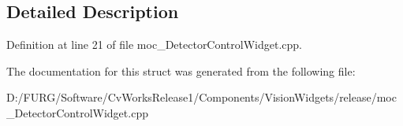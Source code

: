 \subsection{Detailed Description}


Definition at line 21 of file moc\+\_\+\+Detector\+Control\+Widget.\+cpp.



The documentation for this struct was generated from the following file\+:\begin{DoxyCompactItemize}
\item 
D\+:/\+F\+U\+R\+G/\+Software/\+Cv\+Works\+Release1/\+Components/\+Vision\+Widgets/release/moc\+\_\+\+Detector\+Control\+Widget.\+cpp\end{DoxyCompactItemize}
